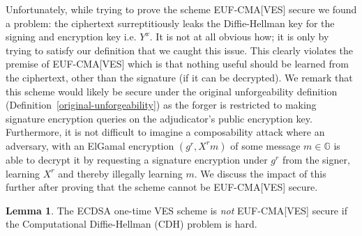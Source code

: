 \documentclass[fullpage]{article}
\theoremstyle{definition}
\newtheorem{lemma}{Lemma}[section]
\newcommand{\EUFCMAVES}{\textsf{EUF-CMA}[\textsf{VES}]\xspace}
\newcommand{\hatSigma}{\hat{\Sigma}}
\newcommand{\G}{\mathbb{G}}
\begin{document}
Unfortunately, while trying to prove the scheme \EUFCMAVES secure we found a problem: the ciphertext surreptitiously leaks the Diffie-Hellman key for the signing and encryption key i.e. $Y^x$. It is not at all obvious how; it is only by trying to satisfy our definition that we caught this issue. This clearly violates the premise of \EUFCMAVES which is that nothing useful should be learned from the ciphertext, other than the signature (if it can be decrypted). We remark that this scheme would likely be secure under the original unforgeability definition (Definition~\ref{original-unforgeability}) as the forger is restricted to making signature encryption queries on the adjudicator's public encryption key. Furthermore, it is not difficult to imagine a composability attack where an adversary, with an ElGamal encryption $(g^r, X^rm)$ of some message $m \in \G$ is able to decrypt it by requesting a signature encryption under $g^r$ from the signer, learning $X^r$ and thereby illegally learning $m$. We discuss the impact of this further after proving that the scheme cannot be \EUFCMAVES secure.

\begin{lemma}
\label{ecdsa-ves-not-secure}
The ECDSA one-time VES scheme is \emph{not} \EUFCMAVES secure if the Computational Diffie-Hellman (CDH) problem is hard.
\end{lemma}

\newcommand{\ECDSAVES}{\hatSigma_{\text{ECDSA}}}
\newcommand{\CDH}{\textsf{CDH}}
\end{document}
